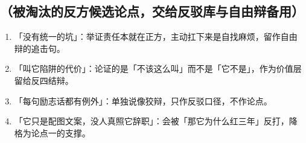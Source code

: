 \documentclass[prep,both]{debate}
\begin{document}
\subsection{（被淘汰的反方候选论点，交给反驳库与自由辩备用）}
\begin{enumerate}[leftmargin=1.8em]
\item 「没有统一的坑」：举证责任本就在正方，主动扛下来是自找麻烦，留作自由辩的追击句。
\item 「叫它陷阱的代价」：论证的是「不该这么叫」而不是「它不是」，作为价值层留给反四结辩。
\item 「每句励志话都有例外」：单独说像狡辩，只作反驳口径，不作论点。
\item 「它只是配图文案，没人真照它辞职」：会被「那它为什么红三年」反打，降格为论点一的支撑。
\end{enumerate}
\end{document}
